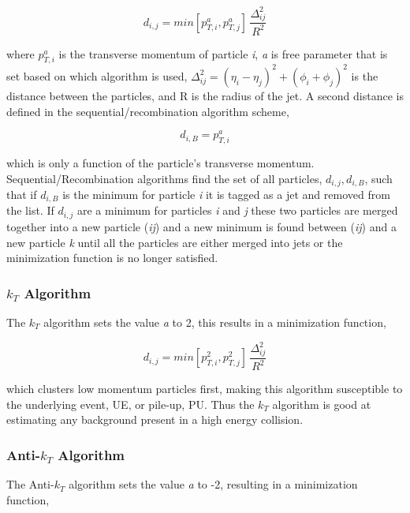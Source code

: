 \begin{equation}
d_{i,j} = min[p^{a}_{T,i},p^{a}_{T,j}] \, \frac{\Delta^{2}_{ij}}{R^{2}}
\label{eq:JetAlgo}
\end{equation}

\noindent
where $p^{a}_{T,i}$ is the transverse momentum of particle \textit{i}, \textit{a} is free parameter that is set based on which algorithm is used, $\Delta^{2}_{ij} = (\eta_{i} - \eta_{j})^{2} + (\phi_{i} + \phi_{j})^{2}$ is the distance between the particles, and R is the radius of the jet.  A second distance is defined in the sequential/recombination algorithm scheme,

\begin{equation}
d_{i,B} = p^{a}_{T,i}
\label{eq:MinJet}
\end{equation}

\noindent
which is only a function of the particle's transverse momentum.  Sequential/Recombination algorithms find the set of all particles, ${d_{i,j},d_{i,B}}$, such that if $d_{i,B}$ is the minimum for particle \textit{i} it is tagged as a jet and removed from the list.  If $d_{i,j}$ are a minimum for particles \textit{i} and \textit{j} these two particles are merged together into a new particle (\textit{ij}) and a new minimum is found between (\textit{ij}) and a new particle \textit{k} until all the particles are either merged into jets or the minimization function is no longer satisfied.

\subsubsection{$k_{T}$ Algorithm}
The $k_{T}$ algorithm sets the value \textit{a} to 2, this results in a minimization function,

\begin{equation}
d_{i,j} = min[p^{2}_{T,i},p^{2}_{T,j}] \, \frac{\Delta^{2}_{ij}}{R^{2}}
\label{eq:kt}
\end{equation}

\noindent
which clusters low momentum particles first, making this algorithm susceptible to the underlying event, UE, or pile-up, PU.  Thus the $k_{T}$ algorithm is good at estimating any background present in a high energy collision. 

\subsubsection{Anti-$k_{T}$ Algorithm}
The Anti-$k_{T}$ algorithm sets the value \textit{a} to -2, resulting in a minimization function,

